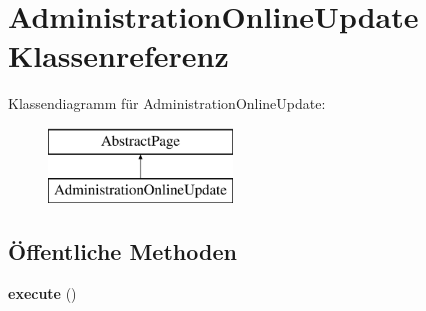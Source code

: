 \hypertarget{class_administration_online_update}{}\section{Administration\+Online\+Update Klassenreferenz}
\label{class_administration_online_update}
Klassendiagramm für Administration\+Online\+Update\+:\begin{figure}[H]
\begin{center}
\leavevmode
\includegraphics[height=2.000000cm]{class_administration_online_update}
\end{center}
\end{figure}
\subsection*{Öffentliche Methoden}
\begin{DoxyCompactItemize}
\item 
\mbox{\label{class_administration_online_update_a955a55412e3f4bd296df3ea1d14047b3}} 
{\bfseries execute} ()
\end{DoxyCompactItemize}
